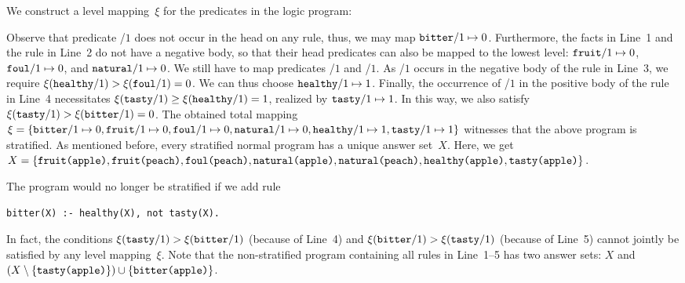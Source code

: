 \begin{example}\label{ex:strat:prog}
We construct a level mapping~$\xi$ for the predicates in the logic program:
%

%
Observe that predicate /$1$ does not occur in the head on any rule, thus,
we may map
$\texttt{bitter}/1 \mapsto 0$.
Furthermore, the facts in Line~1 and the rule in Line~2 do not have
a negative body, so that their head predicates can also be mapped to the lowest level:
$\texttt{fruit}/1 \mapsto 0$,
$\texttt{foul}/1 \mapsto 0$, and
$\pred{natural}/1 \mapsto\nolinebreak 0$.
We still have to map predicates /$1$ and /$1$.
As /$1$ occurs in the negative body of the rule in Line~3,
we require 
$\xi(\texttt{healthy}/1)>\xi(\texttt{foul}/1)=0$.
We can thus choose 
$\texttt{healthy}/1 \mapsto 1$.
Finally, the occurrence of /$1$ in the positive body of the rule in Line~4
necessitates $\xi(\texttt{tasty}/1)\geq\xi(\texttt{healthy}/1)=1$, realized by
$\texttt{tasty}/1 \mapsto 1$.
In this way, we also satisfy $\xi(\texttt{tasty}/1)>\xi(\texttt{bitter}/1)=0$.
The obtained total mapping 
$
\xi
=
\{
\pred{bitter}/1 \mapsto 0,\linebreak[1]
\pred{fruit}/1 \mapsto 0,\linebreak[1]
\pred{foul}/1 \mapsto 0,\linebreak[1]
\pred{natural}/1 \mapsto 0,\linebreak[1]
\pred{healthy}/1 \mapsto 1,\linebreak[1]
\pred{tasty}/1 \mapsto 1
\}
$
witnesses that the above program is stratified.
As mentioned before, every stratified normal program has a unique answer set~$X$.
Here, we get
$
X
=
\{
\code{\pred{fruit}(\const{apple})},\linebreak[1]
\code{\pred{fruit}(\const{peach})},\linebreak[1]
\code{\pred{foul}(\const{peach})},\linebreak[1]
\code{\pred{natural}(\const{apple})},\linebreak[1]
\code{\pred{natural}(\const{peach})},\linebreak[1]
\code{\pred{healthy}(\const{apple})},\linebreak[1]
\code{\pred{tasty}(\const{apple})}
\}
$.

The program would no longer be stratified if we add rule
%
\begin{lstlisting}[firstnumber=5]
bitter(X) :- healthy(X), not tasty(X).
\end{lstlisting}
%
In fact, the conditions $\xi(\texttt{tasty}/1)>\xi(\texttt{bitter}/1)$
(because of Line~4) and $\xi(\texttt{bitter}/1)>\xi(\texttt{tasty}/1)$
(because of Line~5) cannot jointly be satisfied by any level mapping~$\xi$.
Note that the non-stratified program containing all rules in Line~1--5
has two answer sets: $X$ and
$(X\setminus\{\texttt{\texttt{tasty}(\texttt{apple})}\})\cup\{\texttt{\texttt{bitter}(\texttt{apple})}\}$.
\eexample
\end{example}

